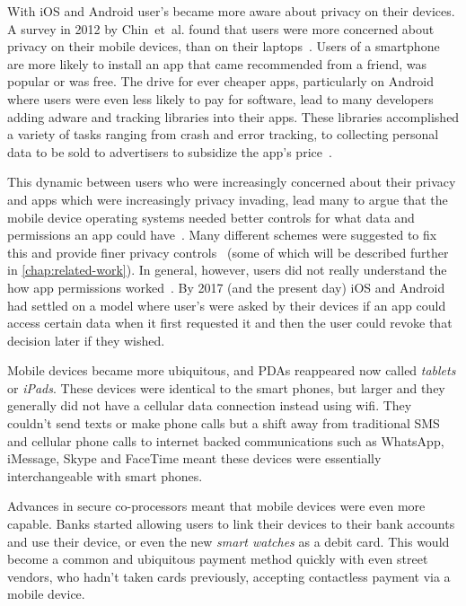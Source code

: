\documentclass[thesis.tex]{subfiles}
\begin{document}
With iOS and Android user's became more aware about privacy on their
devices.  A survey in 2012 by Chin~et~al{.} found that users were more
concerned about privacy on their mobile devices, than on their
laptops~\cite{chin_measuring_2012}. Users of a smartphone are more
likely to install an app that came recommended from a friend, was
popular or was free.  The drive for ever cheaper apps, particularly on
Android where users were even less likely to pay for software, lead to
many developers adding adware and tracking libraries into their apps.
These libraries accomplished a variety of tasks ranging from crash and
error tracking, to collecting personal data to be sold to advertisers
to subsidize the app's price~\cite{seungyeop_han_study_2012}.

This dynamic between users who were increasingly concerned about their
privacy and apps which were increasingly privacy invading, lead many
to argue that the mobile device operating systems needed better
controls for what data and permissions an app could
have~\cite{leontiadis_dont_2012}.  Many different schemes were
suggested to fix this and provide finer privacy
controls~\cite{jeon_dr._2012,beresford_mockdroid:_2011,conti_crepe:2010,backes_appguard_2013}
(some of which will be described further in
\autoref{chap:related-work}).  In general, however, users did not
really understand the how app permissions
worked~\cite{felt_android_2012}.  By 2017 (and the present day) iOS
and Android had settled on a model where user's were asked by their
devices if an app could access certain data when it first requested it
and then the user could revoke that decision later if they wished.

Mobile devices became more ubiquitous, and \ac{PDAs} reappeared now
called \emph{tablets} or \emph{iPads}.  These devices were identical
to the smart phones, but larger and they generally did not have a
cellular data connection instead using wifi. They couldn't send
texts or make phone calls but a shift away from traditional SMS and
cellular phone calls to internet backed communications such as
WhatsApp, iMessage, Skype and FaceTime meant these devices were
essentially interchangeable with smart phones.

Advances in secure co-processors meant that mobile devices were even
more capable.  Banks started allowing users to link their devices to
their bank accounts and use their device, or even the new \emph{smart
watches} as a debit card.  This would become a common and ubiquitous
payment method quickly with even street vendors, who hadn't taken
cards previously, accepting contactless payment via a mobile device.
\end{document}
